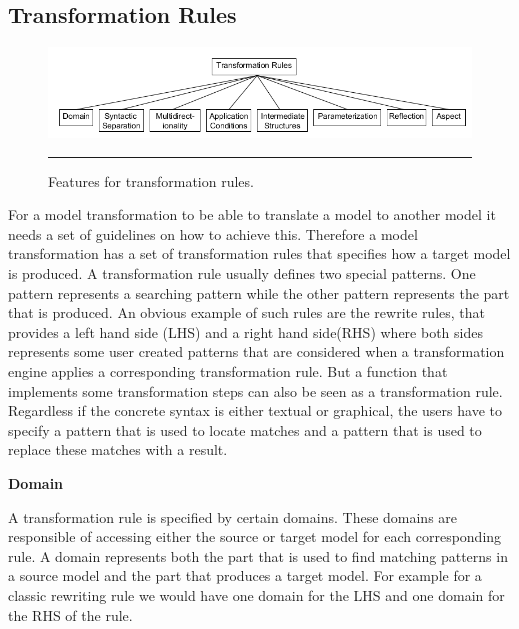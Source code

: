 
\subsection{Transformation Rules}

\begin{figure}[H]
  \centering
    \includegraphics[scale=0.7]{./Figures/TransformationRules.png}
    \rule{35em}{0.5pt}
  \caption[Feature diagram for transformation rules]
  {Features for transformation rules.}
  \label{fig:TransformationRules}
\end{figure}

For a model transformation to be able to translate a model to another model it
needs a set of guidelines on how to achieve this. Therefore a model
transformation has a set of transformation rules that specifies how a target
model is produced. A transformation rule usually defines two special patterns.
One pattern represents a searching pattern while the other pattern represents
the part that is produced.  An obvious example of such rules are the rewrite
rules, that provides a left hand side (LHS) and a right hand side(RHS) where
both sides represents some user created patterns that are considered when a
transformation engine applies a corresponding transformation rule. But a
function that implements some transformation steps can also be seen as a
transformation rule. Regardless if the concrete syntax is either textual or
graphical, the users have to specify a pattern that is used to locate matches
and a pattern that is used to replace these matches with a result.

\textbf{Domain}

A transformation rule is specified by certain domains. These domains are
responsible of accessing either the source or target model for each
corresponding rule. A domain represents both the part that is used to find
matching patterns in a source model and the part that produces a target model.
For example for a classic rewriting rule we would have one domain for the LHS
and one domain for the RHS of the rule. 

